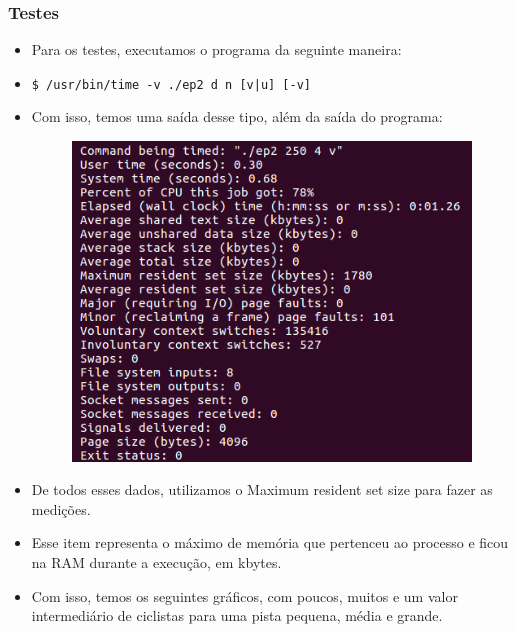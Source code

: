 \documentclass{beamer}
\begin{document}
\begin{frame}
	\frametitle{Testes}
	\begin{itemize}
		\item Para os testes, executamos o programa da seguinte maneira:
		\item \quad \texttt{\$ /usr/bin/time -v ./ep2 d n [v|u] [-v]}
		\item Com isso, temos uma saída desse tipo, além da saída do programa:
		\begin{figure}[!h]
			\centering
			\includegraphics[scale=0.4]{4.png}
		\end{figure}
	\end{itemize}
\end{frame}

\begin{frame}
	\begin{itemize}
		\item De todos esses dados, utilizamos o Maximum resident set size para fazer as medições.
		\item Esse item representa o máximo de memória que pertenceu ao processo e ficou na RAM durante a execução, em kbytes.
		\item Com isso, temos os seguintes gráficos, com poucos, muitos e um valor intermediário de ciclistas para uma pista pequena, média e grande.
	\end{itemize}
\end{frame}
\end{document}
